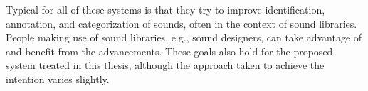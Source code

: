 Typical for all of these systems is that they try to improve identification, annotation, and categorization of sounds, often in the context of sound libraries. People making use of sound libraries, e.g., sound designers, can take advantage of and benefit from the advancements. These goals also hold for the proposed system treated in this thesis, although the approach taken to achieve the intention varies slightly.

\egroup{}